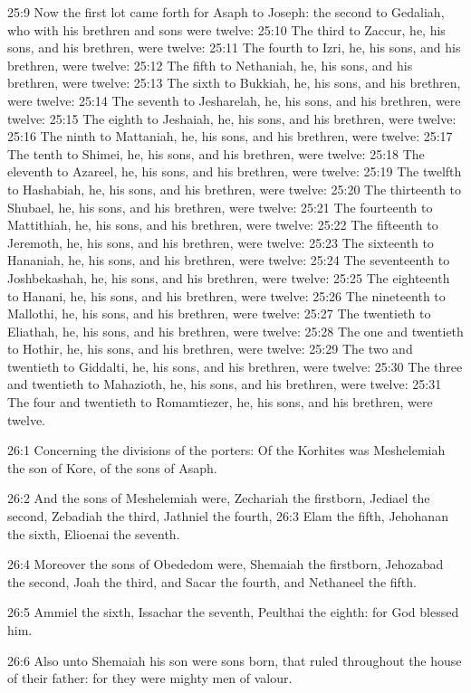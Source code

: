 25:9 Now the first lot came forth for Asaph to Joseph: the second to
Gedaliah, who with his brethren and sons were twelve: 25:10 The third
to Zaccur, he, his sons, and his brethren, were twelve: 25:11 The
fourth to Izri, he, his sons, and his brethren, were twelve: 25:12 The
fifth to Nethaniah, he, his sons, and his brethren, were twelve: 25:13
The sixth to Bukkiah, he, his sons, and his brethren, were twelve:
25:14 The seventh to Jesharelah, he, his sons, and his brethren, were
twelve: 25:15 The eighth to Jeshaiah, he, his sons, and his brethren,
were twelve: 25:16 The ninth to Mattaniah, he, his sons, and his
brethren, were twelve: 25:17 The tenth to Shimei, he, his sons, and
his brethren, were twelve: 25:18 The eleventh to Azareel, he, his
sons, and his brethren, were twelve: 25:19 The twelfth to Hashabiah,
he, his sons, and his brethren, were twelve: 25:20 The thirteenth to
Shubael, he, his sons, and his brethren, were twelve: 25:21 The
fourteenth to Mattithiah, he, his sons, and his brethren, were twelve:
25:22 The fifteenth to Jeremoth, he, his sons, and his brethren, were
twelve: 25:23 The sixteenth to Hananiah, he, his sons, and his
brethren, were twelve: 25:24 The seventeenth to Joshbekashah, he, his
sons, and his brethren, were twelve: 25:25 The eighteenth to Hanani,
he, his sons, and his brethren, were twelve: 25:26 The nineteenth to
Mallothi, he, his sons, and his brethren, were twelve: 25:27 The
twentieth to Eliathah, he, his sons, and his brethren, were twelve:
25:28 The one and twentieth to Hothir, he, his sons, and his brethren,
were twelve: 25:29 The two and twentieth to Giddalti, he, his sons,
and his brethren, were twelve: 25:30 The three and twentieth to
Mahazioth, he, his sons, and his brethren, were twelve: 25:31 The four
and twentieth to Romamtiezer, he, his sons, and his brethren, were
twelve.

26:1 Concerning the divisions of the porters: Of the Korhites was
Meshelemiah the son of Kore, of the sons of Asaph.

26:2 And the sons of Meshelemiah were, Zechariah the firstborn,
Jediael the second, Zebadiah the third, Jathniel the fourth, 26:3 Elam
the fifth, Jehohanan the sixth, Elioenai the seventh.

26:4 Moreover the sons of Obededom were, Shemaiah the firstborn,
Jehozabad the second, Joah the third, and Sacar the fourth, and
Nethaneel the fifth.

26:5 Ammiel the sixth, Issachar the seventh, Peulthai the eighth: for
God blessed him.

26:6 Also unto Shemaiah his son were sons born, that ruled throughout
the house of their father: for they were mighty men of valour.

